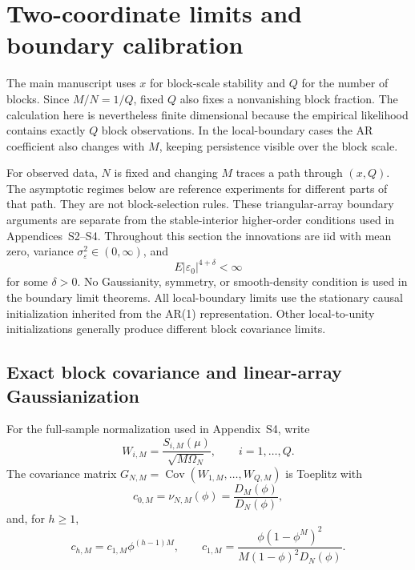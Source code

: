 \documentclass[12pt]{article}
\theoremstyle{remark}
\begin{document}
\section{Two-coordinate limits and boundary calibration}
\label{supp:boundary}
The main manuscript uses $x$ for block-scale stability and $Q$ for the number of blocks. Since $M/N=1/Q$, fixed $Q$ also fixes a nonvanishing block fraction. The calculation here is nevertheless finite dimensional because the empirical likelihood contains exactly $Q$ block observations. In the local-boundary cases the AR coefficient also changes with $M$, keeping persistence visible over the block scale.

For observed data, $N$ is fixed and changing $M$ traces a path through $(x,Q)$. The asymptotic regimes below are reference experiments for different parts of that path. They are not block-selection rules. These triangular-array boundary arguments are separate from the stable-interior higher-order conditions used in Appendices~S2--S4. Throughout this section the innovations are iid with mean zero, variance $\sigma_\varepsilon^2\in(0,\infty)$, and
\[
E|\varepsilon_0|^{4+\delta}<\infty
\]
for some $\delta>0$. No Gaussianity, symmetry, or smooth-density condition is used in the boundary limit theorems.
All local-boundary limits use the stationary causal initialization inherited from the AR(1) representation. Other local-to-unity initializations generally produce different block covariance limits.

\subsection{Exact block covariance and linear-array Gaussianization}
For the full-sample normalization used in Appendix~S4, write
\[
W_{i,M}=\frac{S_{i,M}(\mu)}{\sqrt{M\Omega_N}},
\qquad i=1,\ldots,Q.
\]
The covariance matrix $G_{N,M}=\operatorname{Cov}(W_{1,M},\ldots,W_{Q,M})$ is Toeplitz with
\begin{equation}
c_{0,M}=\nu_{N,M}(\phi)=\frac{D_M(\phi)}{D_N(\phi)},
\label{eq:supp-c0-exact}
\end{equation}
and, for $h\ge1$,
\begin{equation}
c_{h,M}=c_{1,M}\phi^{(h-1)M},
\qquad
c_{1,M}=\frac{\phi(1-\phi^M)^2}{M(1-\phi)^2D_N(\phi)}.
\label{eq:supp-ch-exact}
\end{equation}
\end{document}
